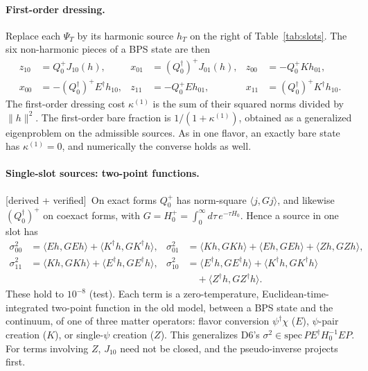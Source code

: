 \documentclass[11pt]{article}
\newcommand{\ip}[2]{\langle #1,#2\rangle}
\newcommand{\tagbox}[2]{\textsf{\small\color{#1}[#2]}}
\newcommand{\VER}{\tagbox{cder}{derived + verified}}
\theoremstyle{plain}
\theoremstyle{remark}
\numberwithin{equation}{section}
\begin{document}
\paragraph{First-order dressing.} Replace each $\Psi_T$ by its harmonic source $h_T$ on the right of
Table~\ref{tab:slots}. The six non-harmonic pieces of a BPS state are then
\begin{equation}\label{eq:first}
\begin{aligned}
z_{10}&=Q_0^+J_{10}(h), & x_{01}&=(Q_0^\dagger)^+J_{01}(h),& z_{00}&=-Q_0^+Kh_{01},\\
x_{00}&=-(Q_0^\dagger)^+E^\dagger h_{10},& z_{11}&=-Q_0^+Eh_{01},& x_{11}&=(Q_0^\dagger)^+K^\dagger h_{10}.
\end{aligned}
\end{equation}
The first-order dressing cost $\kappa^{(1)}$ is the sum of their squared norms divided by $\|h\|^2$. The first-order bare
fraction is $1/(1+\kappa^{(1)})$, obtained as a generalized eigenproblem on the admissible sources. As in one flavor,
an exactly bare state has $\kappa^{(1)}=0$, and numerically the converse holds as well.

\paragraph{Single-slot sources: two-point functions.} \VER\ On exact forms $Q_0^+$ has norm-square $\ip{j}{Gj}$, and
likewise $(Q_0^\dagger)^+$ on coexact forms, with $G=H_0^+=\int_0^\infty d\tau\,e^{-\tau H_0}$. Hence a source in one slot
has
\begin{equation}\label{eq:sigmas}
\begin{aligned}
\sigma^2_{00}&=\ip{E h}{GEh}+\ip{K^\dagger h}{GK^\dagger h}, &
\sigma^2_{01}&=\ip{Kh}{GKh}+\ip{Eh}{GEh}+\ip{Zh}{GZh},\\
\sigma^2_{11}&=\ip{Kh}{GKh}+\ip{E^\dagger h}{GE^\dagger h}, &
\sigma^2_{10}&=\ip{E^\dagger h}{GE^\dagger h}+\ip{K^\dagger h}{GK^\dagger h}\\
&&&\quad+\ip{Z^\dagger h}{GZ^\dagger h}.
\end{aligned}
\end{equation}
These hold to $10^{-8}$ (test). Each term is a zero-temperature, Euclidean-time-integrated two-point function in the old
model, between a BPS state and the continuum, of one of three matter operators: flavor conversion $\psi^\dagger\chi$
($E$), $\psi$-pair creation ($K$), or single-$\psi$ creation ($Z$). This generalizes D6's
$\sigma^2\in\mathrm{spec}\,PE^\dagger H_0^{-1}EP$. For terms involving $Z$, $J_{10}$ need not be closed, and the
pseudo-inverse projects first.
\end{document}
